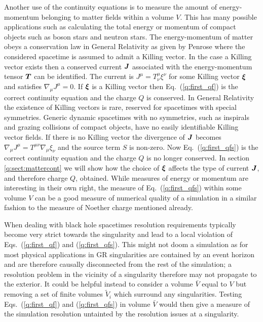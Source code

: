 Another use of the continuity equations is to measure the amount of energy-momentum belonging to matter fields within a volume $V$. This has many possible applications such as calculating the total energy or momentum of compact objects such as boson stars and neutron stars. The energy-momentum of matter obeys a conservation law in General Relativity as given by Penrose \cite{10.2307/2397365} where the considered spacetime is assumed to admit a Killing vector. In the case a Killing vector exists then a conserved current $\boldsymbol{J}$ associated with the energy-momentum tensor $\boldsymbol{T}$ can be identified. The current is $J^\mu = T^\mu_\nu \xi^\nu$ for some Killing vector $\boldsymbol{\xi}$ and satisfies $\nabla_\mu J^\mu = 0$. If $\boldsymbol{\xi}$ is a Killing vector then Eq.~(\ref{q:first_qf}) is the correct continuity equation and the charge $Q$ is conserved. In General Relativity the existence of Killing vectors is rare, reserved for spacetimes with special symmetries. Generic dynamic spacetimes with no symmetries, such as inspirals and grazing collisions of compact objects, have no easily identifiable Killing vector fields. If there is no Killing vector the divergence of $\boldsymbol{J}$ becomes $\nabla_\mu J^\mu = T^{\mu\nu}\nabla_\mu \xi_\nu$ and the source term ${S}$ is non-zero. Now Eq.~(\ref{q:first_qfs}) is the correct continuity equation and the charge $Q$ is no longer conserved. In section \ref{q:sect:mattercont} we will show how the choice of $\boldsymbol{\xi}$ affects the type of current $\boldsymbol{J}$, and therefore charge $Q$, obtained. While measures of energy or momentum are interesting in their own right, the measure of Eq.~(\ref{q:first_qfs}) within some volume ${V}$ can be a good measure of numerical quality of a simulation in a similar fashion to the measure of Noether charge mentioned already. 

When dealing with black hole spacetimes resolution requirements typically become very strict towards the singularity and lead to a local violation of Eqs.~(\ref{q:first_qf}) and (\ref{q:first_qfs}). This might not doom a simulation as for most physical applications in GR singularities are contained by an event horizon and are therefore causally disconnected from the rest of the simulation; a resolution problem in the vicinity of a singularity therefore may not propagate to the exterior. It could be helpful instead to consider a volume $\bar{V}$ equal to $V$ but removing a set of finite volumes $\tilde{V}_i$ which surround any singularities. Testing Eqs.~(\ref{q:first_qf}) and (\ref{q:first_qfs}) in volume $\bar{V}$ would then give a measure of the simulation resolution untainted by the resolution issues at a singularity.

